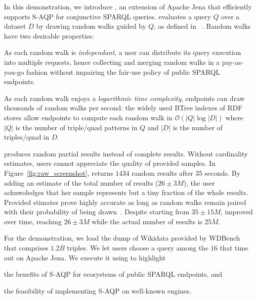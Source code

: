 In this demonstration, we introduce \NAME, an extension of Apache Jena
that efficiently supports S-AQP for conjunctive SPARQL queries. \NAME
evaluates a query $Q$ over a dataset $D$ by drawing random walks
guided by $Q$, as defined in \WANDER~\cite{li2019wanderjoin}. Random
walks have two desirable properties:
\begin{inparaenum}[(i)]
\item As each random walk is \emph{independant}, a user can distribute
  its query execution into multiple requests, hence collecting and
  merging random walks in a pay-as-you-go fashion without impairing
  the fair-use policy of public SPARQL endpoints.
\item As each random walk enjoys a \emph{logarithmic time complexity},
  endpoints can draw thousands of random walks per second: the widely
  used BTree indexes of RDF stores allow endpoints to compute each
  random walk in $\mathcal{O}(|Q| \log |D|)$ where $|Q|$ is the number
  of triple/quad patterns in $Q$ and $|D|$ is the number of
  triples/quad in $D$.
\end{inparaenum}

\NAME produces random partial results instead of complete
results. Without cardinality estimates, users cannot appreciate the
quality of provided samples. In Figure~\ref{fig:raw_screenshot}, \NAME
returns $1434$ random results after $35$ seconds. By adding an
estimate of the total number of results ($26 \pm 3M$), the user
acknwoledges that her sample represents but a tiny fraction of the
whole results.  Provided stimates prove highly accurate as long as
random walks remain paired with their probability of being
drawn~\cite{DBLP:conf/sigmod/ParkKBKHH20}. Despite starting from $35
\pm 15M$, \NAME improved over time, reaching $26\pm 3M$ while the
actual number of results is $25M$.

For the demonstration, we load the dump of Wikidata provided by
WDBench~\cite{angles2022wdbench} that comprises $1.2B$ triples.  We
let users choose a query among the $16$ that time out on Apache
Jena. We execute it using \NAME to highlight
\begin{inparaenum}[(i)]
\item the benefits of S-AQP for ecosystems of public SPARQL endpoints,
  and
\item the feasibility of implementing S-AQP on well-known engines.
\end{inparaenum}

%



